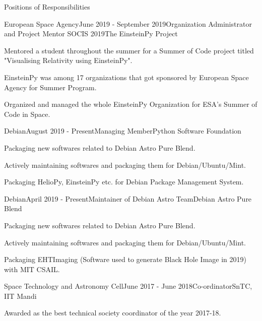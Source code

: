 \documentclass{resume} %
\begin{document}
\begin{rSection}{Positions of Responsibilities}


\begin{rSubsection}{European Space Agency}{June 2019 - September 2019}{Organization Administrator and Project Mentor SOCIS 2019}{The EinsteinPy Project}
\item Mentored a student throughout the summer for a Summer of Code project titled "Visualising Relativity using EinsteinPy". 
\item EinsteinPy was among 17 organizations that got sponsored by European Space Agency for Summer Program.
\item Organized and managed the whole EinsteinPy Organization for ESA's Summer of Code in Space.
 \end{rSubsection}
 
\begin{rSubsection}{Debian}{August 2019 - Present}{Managing Member}{Python Software Foundation}
\item Packaging new softwares related to Debian Astro Pure Blend.
\item Actively maintaining softwares  and packaging them for Debian/Ubuntu/Mint.
\item Packaging HelioPy, EinsteinPy etc. for Debian Package Management System.
\end{rSubsection}


\begin{rSubsection}{Debian}{April 2019 - Present}{Maintainer of Debian Astro Team}{Debian Astro Pure Blend}
\item Packaging new softwares related to Debian Astro Pure Blend.
\item Actively maintaining softwares  and packaging them for Debian/Ubuntu/Mint.
\item Packaging EHTImaging (Software used to generate Black Hole Image in 2019) with MIT CSAIL.
\end{rSubsection}



\begin{rSubsection}{Space Technology and Astronomy Cell}{June 2017 - June 2018}{Co-ordinator}{SnTC, IIT Mandi}
\item Awarded as the best technical society coordinator of the year 2017-18. 
 \end{rSubsection}
\end{rSection}
\end{document}

